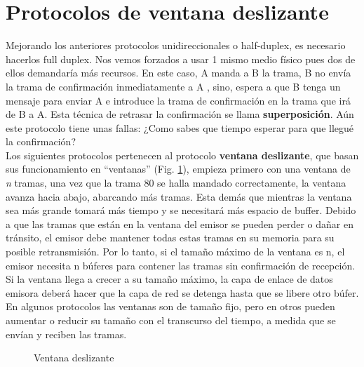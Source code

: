 \documentclass[
	12pt, %
	fleqn, %
	a4paper, %
]{LegrandOrangeBook}
\begin{document}
\section{Protocolos de ventana deslizante}
Mejorando los anteriores protocolos unidireccionales o half-duplex, es necesario hacerlos full duplex. Nos vemos forzados a usar 1 mismo medio físico pues dos de ellos demandaría más recursos. En este caso, A manda a B la trama, B no envía la trama de confirmación inmediatamente a A , sino,  espera a que B tenga un mensaje para enviar A e introduce la trama de confirmación en la trama que irá de B a A. Esta técnica de retrasar la confirmación se llama \textbf{superposición}. Aún este protocolo tiene unas fallas: ¿Como sabes que tiempo esperar para que llegué la confirmación?\\
Los siguientes protocolos pertenecen al protocolo \textbf{ventana deslizante}, que basan sus funcionamiento en ``ventanas'' (Fig. \ref{fig: Ventana deslizante}), empieza primero con una ventana de \textit{n} tramas, una vez que la trama 80 se halla mandado correctamente, la ventana avanza hacia abajo, abarcando más tramas. Esta demás que mientras la ventana sea más grande tomará más tiempo y se necesitará más espacio de buffer. Debido a que las tramas que están en la ventana del emisor se pueden perder o dañar en tránsito, el emisor debe mantener todas estas tramas en su memoria para su posible retransmisión. Por lo tanto, si el tamaño máximo de la ventana es n, el emisor necesita n búferes para contener las tramas sin confirmación de recepción. Si la ventana llega a crecer a su tamaño máximo, la capa de enlace de datos emisora deberá hacer que la capa de red se detenga hasta que se libere otro búfer. En algunos protocolos las ventanas son de tamaño fijo, pero en otros pueden aumentar o reducir su tamaño con el transcurso del tiempo, a medida que se envían y reciben
las tramas.
\begin{figure}[]
\centering
{}
\caption{Ventana deslizante}
\label{fig: Ventana deslizante}
\end{figure}
\end{document}
